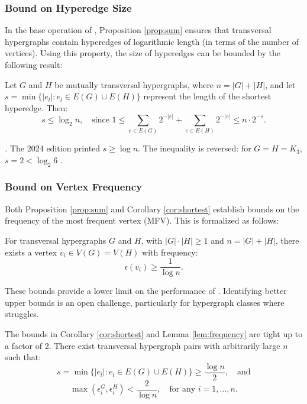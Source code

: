 \subsubsection*{Bound on Hyperedge Size}

In the base operation of \FKA, Proposition \ref{prop:sum} ensures that transversal hypergraphs contain hyperedges of logarithmic length (in terms of the number of vertices). Using this property, the size of hyperedges can be bounded by the following result:

\begin{corollary}\label{cor:shortest}
Let $G$ and $H$ be mutually transversal hypergraphs, where $n=|G|+|H|$, and let $s=\min\{|e_l|:e_l\in E(G)\cup E(H)\}$ represent the length of the shortest hyperedge. Then:
\[
s\leq\log_2 n,\quad\text{since }1\leq\sum_{e\in E(G)}2^{-|e|}+\sum_{e\in E(H)}2^{-|e|}\leq n\cdot 2^{-s}.
\]
\end{corollary}
\noindent\textit{\cite{FK96}.} The 2024 edition printed $s\geq\log n$. The inequality is reversed: for $G=H=K_3$, $s=2<\log_2 6$ .

\subsubsection*{Bound on Vertex Frequency}

Both Proposition \ref{prop:sum} and Corollary \ref{cor:shortest} establish bounds on the frequency of the most frequent vertex (MFV). This is formalized as follows:

\begin{lemma}\label{lem:frequency}
For transversal hypergraphs $G$ and $H$, with $|G|\cdot|H|\geq 1$ and $n=|G|+|H|$, there exists a vertex $v_i\in V(G)=V(H)$ with frequency:
\[
\epsilon(v_i)\geq\frac{1}{\log n}.
\]
\end{lemma}
\noindent\textit{\cite{FK96}}

These bounds provide a lower limit on the performance of \FKA. Identifying better upper bounds is an open challenge, particularly for hypergraph classes where \FKA{} struggles.

\begin{observation}\label{obs:tight}
The bounds in Corollary \ref{cor:shortest} and Lemma \ref{lem:frequency} are tight up to a factor of 2. There exist transversal hypergraph pairs with arbitrarily large $n$ such that:
\[
s=\min\{|e_l|:e_l\in E(G)\cup E(H)\}\geq\frac{\log n}{2},\quad\text{and}
\]
\[
\max\left(\epsilon_i^G,\epsilon_i^H\right)<\frac{2}{\log n},\quad\text{for any }i=1,\dots,n.
\]
\end{observation}
\noindent\textit{\cite{FK96}}


